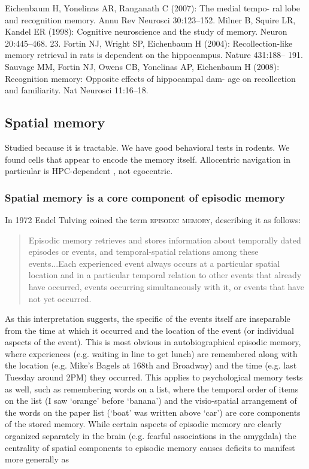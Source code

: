 Eichenbaum H, Yonelinas AR, Ranganath C (2007): The medial tempo- ral lobe and recognition memory. Annu Rev Neurosci 30:123–152.
Milner B, Squire LR, Kandel ER (1998): Cognitive neuroscience and the study of memory. Neuron 20:445–468.
23.
Fortin NJ, Wright SP, Eichenbaum H (2004): Recollection-like memory retrieval in rats is dependent on the hippocampus. Nature 431:188– 191.
Sauvage MM, Fortin NJ, Owens CB, Yonelinas AP, Eichenbaum H (2008): Recognition memory: Opposite effects of hippocampal dam- age on recollection and familiarity. Nat Neurosci 11:16–18.

\subsection{Spatial memory}\label{sec:intro:hpc:spatial}
Studied because it is tractable.
We have good behavioral tests in rodents.
We found cells that appear to encode the memory itself.
Allocentric navigation in particular is \ac{HPC}-dependent \citep{OKeefe1978, Smith1989}, not egocentric.

\subsubsection{Spatial memory is a core component of episodic memory}\label{sec:intro:hpc:spatial-episodic}
In 1972 Endel Tulving coined the term \textsc{episodic memory}, describing it as follows:

\begin{quote}
Episodic memory retrieves and stores information about temporally dated episodes or events, and temporal-spatial relations among these events...Each experienced event always occurs at a particular spatial location and in a particular temporal relation to other events that already have occurred, events occurring simultaneously with it, or events that have not yet occurred.
\end{quote}

As this interpretation suggests, the specific of the events itself are inseparable from the time at which it occurred and the location of the event (or individual aspects of the event).
This is most obvious in autobiographical episodic memory, where experiences (e.g. waiting in line to get lunch) are remembered along with the location (e.g. Mike's Bagels at 168th and Broadway) and the time (e.g. last Tuesday around 2PM) they occurred.
This applies to psychological memory tests as well, such as remembering words on a list, where the temporal order of items on the list (I saw `orange' before `banana') and the visio-spatial arrangement of the words on the paper list (`boat' was written above `car') are core components of the stored memory.
While certain aspects of episodic memory are clearly organized separately in the brain (e.g. fearful associations in the amygdala) the centrality of spatial components to episodic memory causes deficits to manifest more generally as 

